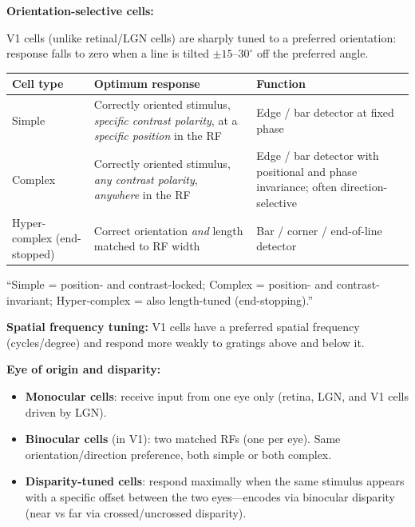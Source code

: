 \separator

\textbf{Orientation-selective cells:}

V1 cells (unlike retinal/LGN cells) are sharply tuned to a preferred orientation: response falls to zero when a line is tilted $\pm 15$--$30^\circ$ off the preferred angle.

\begin{center}
\renewcommand{\arraystretch}{1.3}
\begin{tabular}{@{} l p{4.5cm} p{6cm} @{}}
\toprule
\textbf{Cell type} & \textbf{Optimum response} & \textbf{Function} \\
\midrule
Simple & Correctly oriented stimulus, \emph{specific contrast polarity}, at a \emph{specific position} in the RF & Edge / bar detector at fixed phase \\
Complex & Correctly oriented stimulus, \emph{any contrast polarity}, \emph{anywhere} in the RF & Edge / bar detector with positional and phase invariance; often direction-selective \\
Hyper-complex (end-stopped) & Correct orientation \emph{and} length matched to RF width & Bar / corner / end-of-line detector \\
\bottomrule
\end{tabular}
\end{center}

\begin{tipbox}
``Simple = position- and contrast-locked; Complex = position- and contrast-invariant; Hyper-complex = also length-tuned (end-stopping).''
\end{tipbox}

\separator

\textbf{Spatial frequency tuning:} V1 cells have a preferred spatial frequency (cycles/degree) and respond more weakly to gratings above and below it.

\textbf{Eye of origin and disparity:}
\begin{itemize}
  \item \textbf{Monocular cells}: receive input from one eye only (retina, LGN, and V1 cells driven by LGN).
  \item \textbf{Binocular cells} (in V1): two matched RFs (one per eye). Same orientation/direction preference, both simple or both complex.
  \item \textbf{Disparity-tuned cells}: respond maximally when the same stimulus appears with a specific offset between the two eyes---encodes  via binocular disparity (near vs far via crossed/uncrossed disparity).
\end{itemize}

